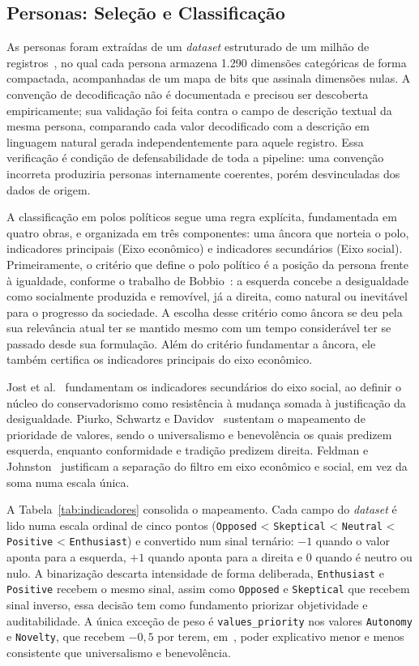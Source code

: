 \subsection{Personas: Seleção e Classificação}

As personas foram extraídas de um \textit{dataset} estruturado de um milhão de
registros~\cite{li2026matraix}, no qual cada persona armazena 1.290 dimensões
categóricas de forma compactada, acompanhadas de um mapa de bits que assinala
dimensões nulas. A convenção de decodificação não é documentada e precisou ser
descoberta empiricamente; sua validação foi feita contra o campo de descrição
textual da mesma persona, comparando cada valor decodificado com a descrição
em linguagem natural gerada independentemente para aquele registro. Essa
verificação é condição de defensabilidade de toda a pipeline: uma convenção
incorreta produziria personas internamente coerentes, porém desvinculadas dos
dados de origem.

A classificação em polos políticos segue uma regra explícita, fundamentada em
quatro obras, e organizada em três componentes: uma âncora que norteia o polo, indicadores
principais (Eixo econômico) e indicadores secundários (Eixo social). Primeiramente, o critério que define o polo político é a posição da persona frente à igualdade, conforme o trabalho de Bobbio~\cite{bobbio1995direita}: a esquerda concebe a desigualdade como socialmente produzida e removível, já a direita, como natural ou inevitável para o progresso da sociedade. A escolha desse critério como âncora se deu pela sua relevância atual ter se mantido mesmo com um tempo considerável ter se passado desde sua formulação. Além do critério fundamentar a âncora, ele também certifica os indicadores principais do eixo econômico. 

Jost et al.~\cite{jost2003political} fundamentam os indicadores
secundários do eixo social, ao definir o núcleo do conservadorismo como
resistência à mudança somada à justificação da desigualdade. Piurko, Schwartz e
Davidov~\cite{piurko2011basic} sustentam o mapeamento de prioridade de valores, sendo o 
universalismo e benevolência os quais predizem esquerda, enquanto conformidade e tradição
predizem direita. Feldman e Johnston~\cite{feldman2014understanding} justificam
a separação do filtro em eixo econômico e social, em vez da soma numa escala única.

A Tabela~\ref{tab:indicadores} consolida o mapeamento. Cada campo do
\textit{dataset} é lido numa escala ordinal de cinco pontos
(\texttt{Opposed} < \texttt{Skeptical} < \texttt{Neutral} < \texttt{Positive} <
\texttt{Enthusiast}) e convertido num sinal ternário: $-1$ quando o valor
aponta para a esquerda, $+1$ quando aponta para a direita e $0$ quando é
neutro ou nulo. A binarização descarta intensidade de forma deliberada,
\texttt{Enthusiast} e \texttt{Positive} recebem o mesmo sinal, assim como \texttt{Opposed} e \texttt{Skeptical} que recebem sinal inverso, essa decisão tem como fundamento priorizar  objetividade e auditabilidade. A única exceção de peso é
\texttt{values\_priority} nos valores \texttt{Autonomy} e \texttt{Novelty},
que recebem $-0,5$ por terem, em~\cite{piurko2011basic}, poder explicativo
menor e menos consistente que universalismo e benevolência.

